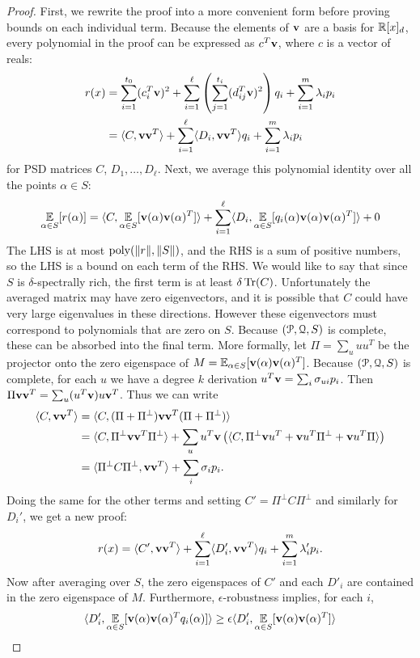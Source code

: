 \documentclass[a4paper,UKenglish]{lipics-v2016}
\begin{document}
\begin{proof}
First, we rewrite the proof into a more convenient form before proving bounds on each individual term. Because the elements of ${\bf v}$ are a basis for $\mathbb R[x]_d$, every polynomial in the proof can be expressed as $c^T{\bf v}$, where $c$ is a vector of reals:
\begin{align*} r(x) &= \sum_{i=1}^{t_0} (c_i^T{\bf v})^2 + \sum_{i=1}^\ell \left(\sum_{j=1}^{t_i} (d_{ij}^T{\bf v})^2\right)q_i + \sum_{i=1}^m \lambda_i p_i \\
&= \langle C, {\bf v}{\bf v}^T\rangle + \sum_{i=1}^\ell \langle D_i, {\bf v}{\bf v}^T\rangle q_i + \sum_{i=1}^m \lambda_i p_i
\end{align*}
for PSD matrices $C$, $D_1,\dots,D_\ell$. Next, we average this polynomial identity over all the points $\alpha \in S$:
\begin{align*}
\operatorname*{\mathbb{E}}_{\alpha \in S}[r(\alpha)] &= \langle C, \operatorname*{\mathbb{E}}_{\alpha \in S}[{\bf v}(\alpha){\bf v}(\alpha)^T]\rangle + \sum_{i=1}^\ell \langle D_i, \operatorname*{\mathbb{E}}_{\alpha \in S}[q_i(\alpha){\bf v}(\alpha){\bf v}(\alpha)^T]\rangle + 0 \\
\end{align*}
The LHS is at most $\operatorname{poly}(\|r\|, \|S\|)$, and the RHS is a sum of positive numbers, so the LHS is a bound on each term of the RHS. 
We would like to say that since $S$ is $\delta$-spectrally rich, the first term is at least $\delta \operatorname{Tr}(C)$. 
Unfortunately the averaged matrix may have zero eigenvectors, and it is possible that $C$ could have very large eigenvalues in these directions. 
However these eigenvectors must correspond to polynomials that are zero on $S$. Because $(\mathcal P, \mathcal Q, S)$ is complete, these can be absorbed into the final term. More formally, let $\Pi = \sum_u uu^T$ be the projector onto the zero eigenspace of $M = \operatorname*{\mathbb{E}}_{\alpha \in S}[{\bf v}(\alpha){\bf v}(\alpha)^T]$. Because $(\mathcal P, \mathcal Q, S)$ is complete, for each $u$ we have a degree $k$ derivation $u^T{\bf v} = \sum_i \sigma_{ui} p_i$. Then $\Pi {\bf v}{\bf v}^T = \sum_u (u^T{\bf v}) u{\bf v}^T$. Thus we can write
\begin{align*}
\langle C, {\bf v}{\bf v}^T\rangle &= \langle C, (\Pi + \Pi^\perp){\bf v}{\bf v}^T(\Pi + \Pi^\perp)\rangle \\
&= \langle C, \Pi^\perp {\bf v}{\bf v}^T \Pi^\perp\rangle + \sum_u u^T{\bf v}\left(\langle C, \Pi^\perp {\bf v}u^T + {\bf v}u^T\Pi^\perp + {\bf v}u^T\Pi\rangle\right) \\
&= \langle \Pi^\perp C \Pi^\perp, {\bf v}{\bf v}^T\rangle + \sum_i \sigma_i p_i.
\end{align*}
Doing the same for the other terms and setting $C' = \Pi^\perp C \Pi^\perp$ and similarly for $D_i'$, we get a new proof:
\[r(x) = \langle C', {\bf v}{\bf v}^T\rangle + \sum_{i=1}^\ell \langle D_i', {\bf v}{\bf v}^T\rangle q_i + \sum_{i=1}^m \lambda_i' p_i.\]
Now after averaging over $S$, the zero eigenspaces of $C'$ and each $D'_i$ are contained in the zero eigenspace of $M$. Furthermore, $\epsilon$-robustness implies, for each $i$,
\[\langle D_i', \operatorname*{\mathbb{E}}_{\alpha \in S}[{\bf v}(\alpha){\bf v}(\alpha)^Tq_i(\alpha)] \rangle \geq \epsilon\langle D_i', \operatorname*{\mathbb{E}}_{\alpha \in S}[{\bf v}(\alpha){\bf v}(\alpha)^T]\rangle\]


\end{proof}
\end{document}
